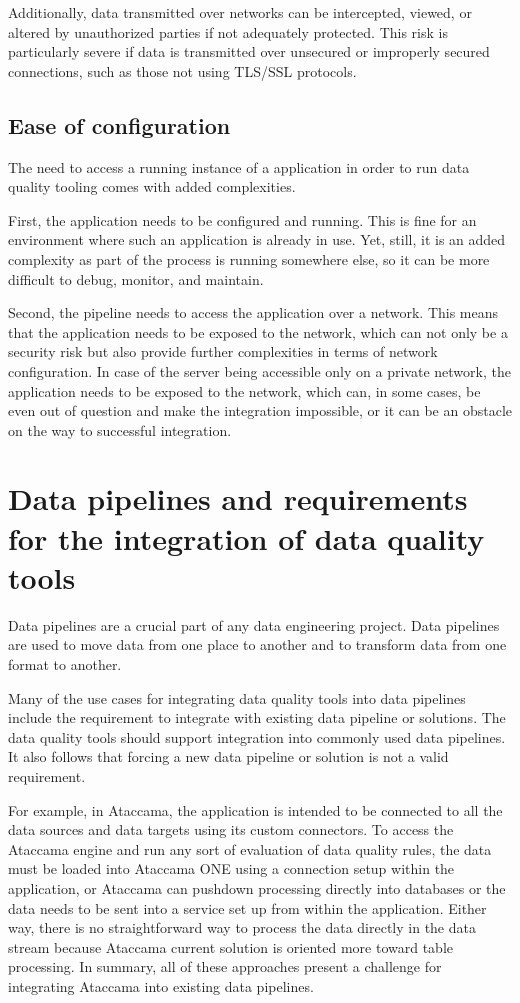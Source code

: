Additionally, data transmitted over networks can be intercepted, viewed, or altered by unauthorized parties if not adequately protected. This risk is particularly severe if data is transmitted over unsecured or improperly secured connections, such as those not using TLS/SSL protocols. 

\subsection{Ease of configuration}

The need to access a running instance of a  application in order to run data quality tooling comes with added complexities.

First, the application needs to be configured and running. This is fine for an environment where such an application is already in use. Yet, still, it is an added complexity as part of the process is running somewhere else, so it can be more difficult to debug, monitor, and maintain.

Second, the pipeline needs to access the application over a network. This means that the application needs to be exposed to the network, which can not only be a security risk but also provide further complexities in terms of network configuration. In case of the server being accessible only on a private network, the application needs to be exposed to the network, which can, in some cases, be even out of question and make the integration impossible, or it can be an obstacle on the way to successful integration.

\section{Data pipelines and requirements for the integration of data quality tools}

Data pipelines are a crucial part of any data engineering project. Data pipelines are used to move data from one place to another and to transform data from one format to another. 

Many of the use cases for integrating data quality tools into data pipelines include the requirement to integrate with existing data pipeline or solutions. The data quality tools should support integration into commonly used data pipelines. It also follows that forcing a new data pipeline or  solution is not a valid requirement. 

For example, in Ataccama, the application is intended to be connected to all the data sources and data targets using its custom connectors. To access the Ataccama engine and run any sort of evaluation of data quality rules, the data must be loaded into Ataccama ONE using a connection setup within the application,  or Ataccama can pushdown processing directly into databases or the data needs to be sent into a service set up from within the application. Either way, there is no straightforward way to process the data directly in the data stream because Ataccama current solution is oriented more toward table processing. In summary, all of these approaches present a challenge for integrating Ataccama into existing data pipelines.

